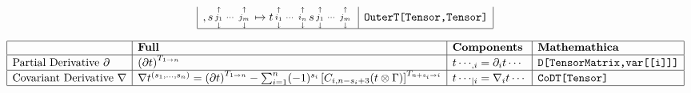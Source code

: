 \documentclass[9pt,a4paper]{scrartcl}
\begin{document}
\begin{align*}
\begin{array}{|l|l|l|l|}
              ,
              s\begin{smallmatrix} 
                \shortuparrow &        & \shortuparrow \\
                j_{1}         &  \cdots& j_{m}     \\
                \shortdownarrow &     & \shortdownarrow
              \end{smallmatrix}
             \mapsto
              t\begin{smallmatrix} 
                \shortuparrow &        & \shortuparrow \\
                i_{1}         &  \cdots& i_{n}     \\
                \shortdownarrow &     & \shortdownarrow
              \end{smallmatrix}
              s\begin{smallmatrix} 
                \shortuparrow &        & \shortuparrow \\
                j_{1}         &  \cdots& j_{m}     \\
                \shortdownarrow &     & \shortdownarrow
              \end{smallmatrix}
                & \texttt{OuterT[Tensor,Tensor]}
    \\\hline
    \end{array}
  \end{align*}
  \addtocounter{footnote}{-1}

  
  \begin{align*}
    \begin{array}{|l|l|l|l|}\hline  
      &\textbf{Full} & \textbf{Components} & \textbf{Mathemathica}
    \\\hline
      \text{Partial Derivative } \partial
          & \left( \partial t \right)^{T_{1\rightarrow n}}
              & t\cdots_{,i} = \partial_{i}t\cdots
                & \texttt{D[TensorMatrix,var[[i]]]}
    \\\hline
      \text{Covariant Derivative } \nabla
          & \nabla t^{(s_{1},\ldots,s_{n})}
              = \left( \partial t \right)^{T_{1\rightarrow n}} 
                  - \sum_{i=1}^{n} (-1)^{s_{i}} \left[ C_{i,n-s_{i}+3}(t\otimes\Gamma) \right]^{T_{n+s_{i}\rightarrow i}}
              & t\cdots_{|i} = \nabla_{i}t\cdots
                  & \texttt{CoDT[Tensor]}
    \\\hline
    \end{array}
  \end{align*}
\end{document}
